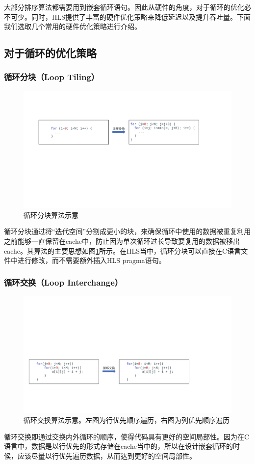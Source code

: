 大部分排序算法都需要用到嵌套循环语句。因此从硬件的角度，对于循环的优化必不可少。同时，HLS提供了丰富的硬件优化策略来降低延迟以及提升吞吐量。下面我们选取几个常用的硬件优化策略进行介绍。

\subsection{对于循环的优化策略}
\subsubsection{循环分块（Loop Tiling）}
\begin{figure}[htbp]
    \centering
    \includegraphics[width=\linewidth]{figures/loop tiling.pdf}
    \caption{循环分块算法示意}
    \label{fig:loop_tiling}
\end{figure}

循环分块通过将“迭代空间”分割成更小的块，来确保循环中使用的数据被重复利用之前能够一直保留在cache中，防止因为单次循环过长导致要复用的数据被移出cache。其算法的主要思想如图\ref{fig:loop_tiling}所示。在HLS当中，循环分块可以直接在C语言文件中进行修改，而不需要额外插入HLS pragma语句。


\subsubsection{循环交换（Loop Interchange）}
\begin{figure}[htbp]
    \centering
    \includegraphics[width=\linewidth]{figures/loop interchange.pdf}
    \caption{循环交换算法示意。左图为行优先顺序遍历，右图为列优先顺序遍历}
    \label{fig:loop_interchange}
\end{figure}
循环交换即通过交换内外循环的顺序，使得代码具有更好的空间局部性。因为在C语言中，数据是以行优先的形式存储在cache当中的，所以在设计嵌套循环的时候，应该尽量以行优先遍历数据，从而达到更好的空间局部性。
